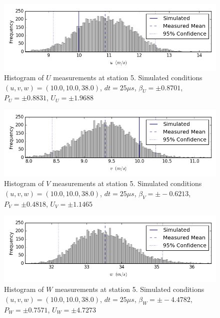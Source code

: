 \begin{figure}[H]
\centering
\includegraphics[width=6in]{figs/Ely_May28th05004/uncertainty_Ely_May28th05004_U}
\caption{Histogram of $U$ measurements at station 5. Simulated conditions $(u,v,w)=(10.0, 10.0, 38.0)$, $dt=25 \mu s$, $\beta_U=\pm 0.8701$, $P_U=\pm 0.8831$, $U_U=\pm 1.9688$}
\label{fig:uncertainty_Ely_May28th05004_U}
\end{figure}


\begin{figure}[H]
\centering
\includegraphics[width=6in]{figs/Ely_May28th05004/uncertainty_Ely_May28th05004_V}
\caption{Histogram of $V$ measurements at station 5. Simulated conditions $(u,v,w)=(10.0, 10.0, 38.0)$, $dt=25 \mu s$, $\beta_V=\pm -0.6213$, $P_V=\pm 0.4818$, $U_V=\pm 1.1465$}
\label{fig:uncertainty_Ely_May28th05004_V}
\end{figure}


\begin{figure}[H]
\centering
\includegraphics[width=6in]{figs/Ely_May28th05004/uncertainty_Ely_May28th05004_W}
\caption{Histogram of $W$ measurements at station 5. Simulated conditions $(u,v,w)=(10.0, 10.0, 38.0)$, $dt=25 \mu s$, $\beta_W=\pm -4.4782$, $P_W=\pm 0.7571$, $U_W=\pm 4.7273$}
\label{fig:uncertainty_Ely_May28th05004_W}
\end{figure}



